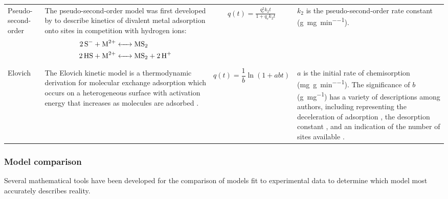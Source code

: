 \begin{landscape}
\begin{footnotesize}
\begin{longtable}{>{\raggedright\arraybackslash}p{2cm}p{6cm}p{6cm}p{7.25cm}}
			Pseudo-second-order
			
			& The pseudo-second-order model was first developed by \textcite{Ho2000} to describe kinetics of divalent metal adsorption onto sites in competition with hydrogen ions:
			{\begin{align*}
			\ce{2S- + M^2+ &<-> MS2} \\
			\ce{2HS + M^2+ &<-> MS2 + 2H+}
			\end{align*}}
			
			& \begin{align}
			q\left(t\right)=\frac{q_e^2k_2t}{1+q_ek_2t} \label{eq:pso}
			\end{align}
			
			& $ k_2 $ is the pseudo-second-order rate constant (\si{\gram\per\milli\gram\per\minute}).  \\
			
			Elovich
			
			& The Elovich kinetic model is a thermodynamic derivation for molecular exchange adsorption which occurs on a heterogeneous surface with activation energy that increases as molecules are adsorbed \parencite{Wu2009,Wang2020}. 
			
			& \begin{equation}
			q(t) = \frac{1}{b} \ln \left( 1+abt\right) \label{eq:elovich-int}
			\end{equation}
			
			& $ a $ is the initial rate of chemisorption (\si{\milli\gram\per\gram\per\minute}). The significance of $ b $ (\si{\gram\per\milli\gram}) has a variety of descriptions among authors, including representing the deceleration of adsorption \parencite{McLintock1970}, the desorption constant \parencite{Tran2017}, and an indication of the number of sites available \parencite{Fierro2008}. \\
			

		\end{longtable}
	\end{footnotesize}
\end{landscape}
\restoregeometry



\subsubsection{Model comparison}

Several mathematical tools have been developed for the comparison of models fit to experimental data to determine which  model most accurately describes reality. 

